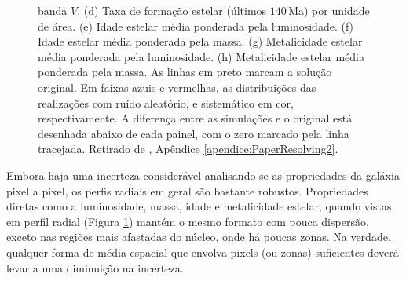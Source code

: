 \begin{figure}
{	banda $V$. (d) Taxa de formação estelar (últimos $140\, \mathrm{Ma}$) por
	unidade de área. (e) Idade estelar média ponderada pela luminosidade. (f) Idade
	estelar média ponderada pela massa. (g) Metalicidade estelar média ponderada
	pela luminosidade. (h) Metalicidade estelar média ponderada pela massa. As
	linhas em preto marcam a solução original. Em faixas azuis e vermelhas, as
	distribuições das realizações com ruído aleatório, e sistemático em cor,
	respectivamente. A diferença entre as simulações e o original está desenhada
	abaixo de cada painel, com o zero marcado pela linha tracejada. Retirado de
	\cite[figura 4]{CidFernandes2014}, Apêndice \ref{apendice:PaperResolving2}.}
	\label{fig:incertRad}
\end{figure}

Embora haja uma incerteza considerável analisando-se as propriedades da galáxia
pixel a pixel, os perfis radiais em geral são bastante robustos. Propriedades
diretas como a luminosidade, massa, idade e metalicidade estelar, quando vistas
em perfil radial (Figura \ref{fig:incertRad}) mantém o mesmo formato com pouca
dispersão, exceto nas regiões mais afastadas do núcleo, onde há poucas zonas. Na
verdade, qualquer forma de média espacial que envolva pixels (ou zonas)
suficientes deverá levar a uma diminuição na incerteza.

